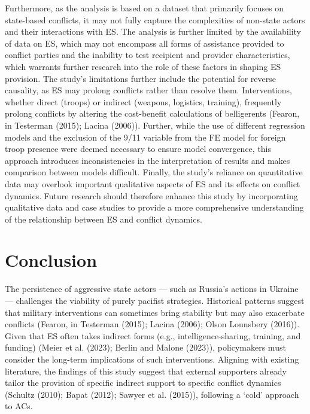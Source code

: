 \documentclass[
]{article}
\begin{document}
Furthermore, as the analysis is based on a dataset that primarily
focuses on state-based conflicts, it may not fully capture the
complexities of non-state actors and their interactions with ES. The
analysis is further limited by the availability of data on ES, which may
not encompass all forms of assistance provided to conflict parties and
the inability to test recipient and provider characteristics, which
warrants further research into the role of these factors in shaping ES
provision. The study's limitations further include the potential for
reverse causality, as ES may prolong conflicts rather than resolve them.
Interventions, whether direct (troops) or indirect (weapons, logistics,
training), frequently prolong conflicts by altering the cost-benefit
calculations of belligerents (Fearon, in Testerman (2015); Lacina
(2006)). Further, while the use of different regression models and the
exclusion of the 9/11 variable from the FE model for foreign troop
presence were deemed necessary to ensure model convergence, this
approach introduces inconsistencies in the interpretation of results and
makes comparison between models difficult. Finally, the study's reliance
on quantitative data may overlook important qualitative aspects of ES
and its effects on conflict dynamics. Future research should therefore
enhance this study by incorporating qualitative data and case studies to
provide a more comprehensive understanding of the relationship between
ES and conflict dynamics.

\section{Conclusion}\label{conclusion}

The persistence of aggressive state actors --- such as Russia's actions
in Ukraine --- challenges the viability of purely pacifist strategies.
Historical patterns suggest that military interventions can sometimes
bring stability but may also exacerbate conflicts (Fearon, in Testerman
(2015); Lacina (2006); Olson Lounsbery (2016)). Given that ES often
takes indirect forms (e.g., intelligence-sharing, training, and funding)
(Meier et al. (2023); Berlin and Malone (2023)), policymakers must
consider the long-term implications of such interventions. Aligning with
existing literature, the findings of this study suggest that external
supporters already tailor the provision of specific indirect support to
specific conflict dynamics (Schultz (2010); Bapat (2012); Sawyer et al.
(2015)), following a `cold' approach to ACs.
\end{document}
